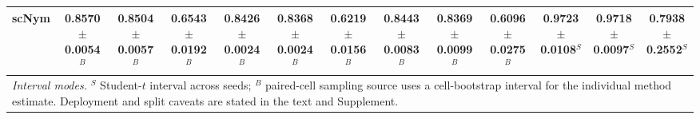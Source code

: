 \begin{tabular}{p{1.9cm}cccccccccccc}
scNym & 0.8570$\pm$0.0054$^{B}$ & 0.8504$\pm$0.0057$^{B}$ & 0.6543$\pm$0.0192$^{B}$ & 0.8426$\pm$0.0024$^{B}$ & 0.8368$\pm$0.0024$^{B}$ & 0.6219$\pm$0.0156$^{B}$ & 0.8443$\pm$0.0083$^{B}$ & 0.8369$\pm$0.0099$^{B}$ & 0.6096$\pm$0.0275$^{B}$ & 0.9723$\pm$0.0108$^{S}$ & 0.9718$\pm$0.0097$^{S}$ & 0.7938$\pm$0.2552$^{S}$ \\
\midrule
\multicolumn{13}{p{21.0cm}}{\textit{Interval modes.} $^{S}$ Student-$t$ interval across seeds; $^{B}$ paired-cell sampling source uses a cell-bootstrap interval for the individual method estimate. Deployment and split caveats are stated in the text and Supplement.} \\
\bottomrule
\end{tabular}
